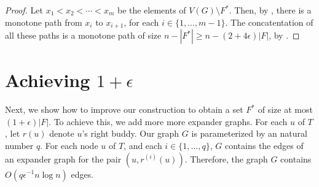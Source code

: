 \documentclass{patmorin}
\begin{document}
\begin{proof}
	Let $x_1<x_2<\cdots<x_m$ be the elements of $V(G)\setminus F^*$.
	Then, by , there is a monotone path from $x_i$
	to $x_{i+1}$, for each $i\in\{1,\ldots,m-1\}$.
	The concatentation of all these paths is a monotone path of size $n-|F^*| \ge n-(2+4\epsilon)|F|$, by .
\end{proof}

\section{Achieving $1+\epsilon$}


Next, we show how to improve our construction to obtain a set $F^*$
of size at most $(1+\epsilon)|F|$.  To achieve this, we add more more
expander graphs. For each $u$ of $T$, let $r(u)$ denote $u$'s right buddy.
Our graph $G$ is parameterized by an natural number $q$.  For each node
$u$ of $T$, and each $i\in\{1,\ldots,q\}$, $G$ contains the edges of an
expander graph for the pair $(u,r^{(i)}(u))$.  Therefore, the graph $G$
contains $O(q\epsilon^{-1} n\log n)$ edges.








\end{document}
